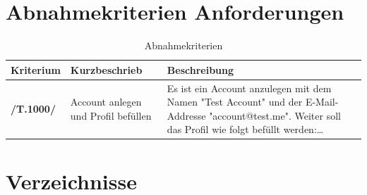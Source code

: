 \documentclass[10pt,a4paper,titlepage,twoside,german,final]{zhawreprt}
\newcommand{\AddRequirement}[2]{
\textbf{/#1#2/}
}
\newcommand{\TF}[1]{
\AddRequirement{T.}{#1}
}
\numberwithin{table}{chapter}
\begin{document}
\chapter{Abnahmekriterien Anforderungen}\label{chp:TestRequirements}
\begin{table}[ht]\centering
\begin{tabular}{l|p{4cm}|p{8cm}}\hline
Kriterium & Kurzbeschrieb & Beschreibung\\\hline
\TF{1000} & Account anlegen und Profil befüllen & Es ist ein Account anzulegen mit dem Namen "Test Account" und der E-Mail-Addresse "account@test.me". Weiter soll das Profil wie folgt befüllt werden:\ldots
\end{tabular}
\caption{Abnahmekriterien}\label{tbl:TestRequirements}
\end{table}
\chapter{Verzeichnisse}\label{chp:Index}
\printglossaries\label{sec:Glossar}
\listoftables
\printindex
\newpage
\label{sec:Bibliography}
\end{document}
